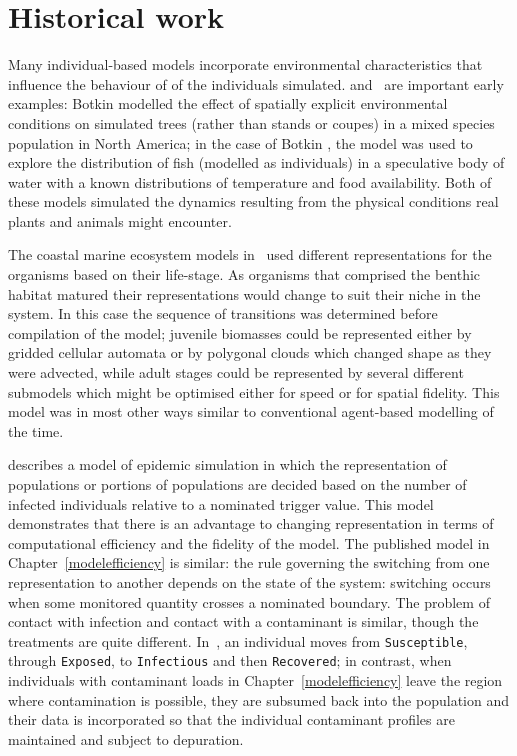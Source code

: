 \section{Historical work}

Many individual-based models incorporate environmental characteristics
that influence the behaviour of of the individuals
simulated.  and~\citet{deangelis1978model} are
important early examples: Botkin \etal modelled the effect of
spatially explicit environmental conditions on simulated trees (rather
than stands or coupes) in a mixed species population in
North America; in the case of Botkin \etal, the model was used to
explore the distribution of fish (modelled as individuals) in a
speculative body of water with a known distributions of temperature
and food availability. Both of these models simulated the 
dynamics resulting from the physical conditions real plants and
animals might encounter. 

The coastal marine ecosystem models in~\cite{gray2006nws} used different
representations for the organisms based on their life-stage. As
organisms that comprised the benthic habitat matured their
representations would change to suit their niche in the system.  In
this case the sequence of transitions was determined before
compilation of the model; juvenile biomasses could be represented
either by gridded cellular automata or by polygonal clouds which
changed shape as they were advected, while adult stages could be
represented by several different submodels which might be optimised
either for speed or for spatial fidelity.  This model was in most
other ways similar to conventional agent-based modelling of the time.


\Cite{bobashev2007hybrid} describes a model of epidemic simulation in
which the representation of populations or portions of populations are
decided based on the number of infected individuals relative to a
nominated trigger value. This model demonstrates that there is an
advantage to changing representation in terms of computational
efficiency and the fidelity of the model. The published model in
Chapter~\ref{modelefficiency} is similar: the rule governing the
switching from one representation to another depends on the state of
the system: switching occurs when some monitored quantity crosses a
nominated boundary. The problem of contact with infection and contact
with a contaminant is similar, though the treatments are quite
different. In~\citet{bobashev2007hybrid}, an individual moves
from \texttt{Susceptible}, through \texttt{Exposed},
to \texttt{Infectious} and then \texttt{Recovered}; in contrast, when
individuals with contaminant loads in Chapter~\ref{modelefficiency}
leave the region where contamination is possible, they are subsumed
back into the population and their data is incorporated so that the
individual contaminant profiles are maintained and subject to
depuration.

